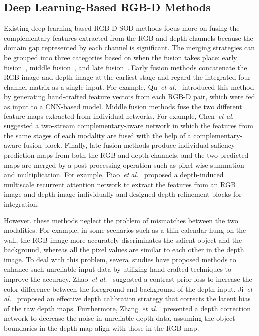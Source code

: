 \documentclass[runningheads]{llncs}
\begin{document}
	\subsection{Deep Learning-Based RGB-D Methods}
	Existing deep learning-based RGB-D SOD methods focus more on fusing the complementary features extracted from the RGB and depth channels because the domain gap represented by each channel is significant. The merging strategies can be grouped into three categories based on when the fusion takes place: early fusion~\cite{qu2017rgbd,song2017depth}, middle fusion~\cite{chen2018progressively,chen2019three}, and late fusion~\cite{fan2020rethinking,piao2019depth}. 
	Early fusion methods concatenate the RGB image and depth image at the earliest stage and regard the integrated four-channel matrix as a single input. For example, Qu~{\textit{et al.}}~\cite{qu2017rgbd} introduced this method by generating hand-crafted feature vectors from each RGB-D pair, which were fed as input to a CNN-based model. 
	Middle fusion methods fuse the two different feature maps extracted from individual networks. For example, Chen~{\textit{et al.}}~\cite{chen2018progressively} suggested a two-stream complementary-aware network in which the features from the same stages of each modality are fused with the help of a complementary-aware fusion block.
	Finally, late fusion methods produce individual saliency prediction maps from both the RGB and depth channels, and the two predicted maps are merged by a post-processing operation such as pixel-wise summation and multiplication. For example, Piao~{\textit{et al.}}~\cite{piao2019depth} proposed a depth-induced multiscale recurrent attention network to extract the features from an RGB image and depth image individually and designed depth refinement blocks for integration.
	
	However, these methods neglect the problem of mismatches between the two modalities. For example, in some scenarios such as a thin calendar hung on the wall, the RGB image more accurately discriminates the salient object and the background, whereas all the pixel values are similar to each other in the depth image. To deal with this problem, several studies have proposed methods to enhance such unreliable input data by utilizing hand-crafted techniques to improve the accuracy. Zhao~{\textit{et al.}}~\cite{zhao2019contrast} suggested a contrast prior loss to increase the color difference between the foreground and background of the depth input. Ji~{\textit{et al.}}~\cite{ji2021calibrated} proposed an effective depth calibration strategy that corrects the latent bias of the raw depth maps. Furthermore, Zhang~{\textit{et al.}}~\cite{zhang2020uc} presented a depth correction network to decrease the noise in unreliable depth data, assuming the object boundaries in the depth map align with those in the RGB map.
	
\end{document}
